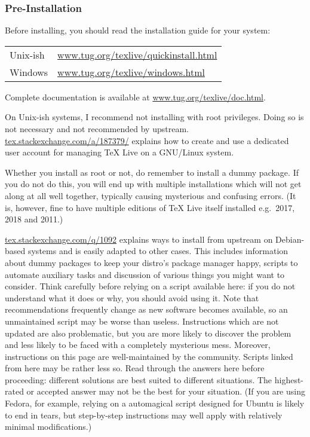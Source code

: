 
\subsubsection<1-| beamer:0>{Pre-Installation}\label{subsubsec:pre}

Before installing, you should read the installation guide for your system:

\begin{tabular}{@{}ll@{}}
  Unix-ish & \url{www.tug.org/texlive/quickinstall.html}\\
  Windows & \url{www.tug.org/texlive/windows.html}\\
\end{tabular}

\noindent Complete documentation is available at \url{www.tug.org/texlive/doc.html}.

On Unix-ish systems, I recommend not installing with root privileges.
Doing so is not necessary and not recommended by upstream.
\url{tex.stackexchange.com/a/187379/} explains how to create and use a dedicated user account for managing \TeX{} Live on a GNU/Linux system.

Whether you install as root or not, do remember to install a dummy package.
If you do not do this, you will end up with multiple installations which will not get along at all well together, typically causing mysterious and confusing errors.
(It is, however, fine to have multiple editions of \TeX{} Live itself installed e.g.~2017, 2018 and 2011.)

\url{tex.stackexchange.com/q/1092} explains ways to install from upstream on Debian-based systems and is easily adapted to other cases. 
This includes information about dummy packages to keep your distro's package manager happy, scripts to automate auxiliary tasks and discussion of various things you might want to consider.
Think carefully before relying on a script available here: if you do not understand what it does or why, you should avoid using it.
Note that recommendations frequently change as new software becomes available, so an unmaintained script may be worse than useless.
Instructions which are not updated are also problematic, but you are more likely to discover the problem and less likely to be faced with a completely mysterious mess.
Moreover, instructions on this page are well-maintained by the community.
Scripts linked from here may be rather less so.
Read through the answers here before proceeding: different solutions are best suited to different situations.
The highest-rated or accepted answer may not be the best for your situation.
(If you are using Fedora, for example, relying on a automagical script designed for Ubuntu is likely to end in tears, but step-by-step instructions may well apply with relatively minimal modifications.)

